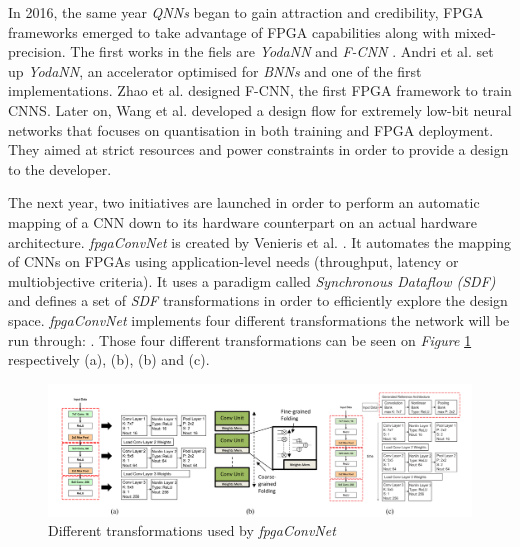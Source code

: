 In 2016, the same year \emph{QNNs} began to gain attraction and credibility, FPGA frameworks emerged to take advantage of FPGA capabilities along with mixed-precision. The first works in the fiels are \emph{YodaNN} \cite{Andri2016} and \emph{F-CNN} \cite{Zhao2016}. Andri et al. set up \emph{YodaNN}, an accelerator optimised for \emph{BNNs} and one of the first implementations. Zhao et al. \cite{Zhao2016} designed F-CNN, the first FPGA framework to train CNNS. Later on, Wang et al. \cite{Wang2018} developed a design flow for extremely low-bit neural networks that focuses on quantisation in both training and FPGA deployment. They aimed at strict resources and power constraints in order to provide a design to the developer.

The next year, two initiatives are launched in order to perform an automatic mapping of a CNN down to its hardware counterpart on an actual hardware architecture. \emph{fpgaConvNet} is created by Venieris et al. \cite{Venieris2017}. It automates the mapping of CNNs on FPGAs using application-level needs (throughput, latency or multiobjective criteria). It uses a paradigm called \emph{Synchronous Dataflow (SDF)} and defines a set of \emph{SDF} transformations in order to efficiently explore the design space. \emph{fpgaConvNet} implements four different transformations the network will be run through: . Those four different transformations can be seen on \emph{Figure} \ref{fig:fpgaConvNetTransformations} respectively (a), (b), (b) and (c).

\begin{figure}[htbp]
	\centering
		\includegraphics[width=\textwidth]{Figures/fpgaConvNetTransformations.png}
	\caption[Inference Optimisations]{Different transformations used by \emph{fpgaConvNet} \cite{Venieris2017}}
	\label{fig:fpgaConvNetTransformations}
\end{figure}


